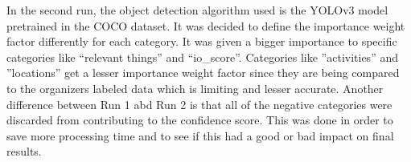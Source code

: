     In the second run, the object detection algorithm used is the YOLOv3 model pretrained in the COCO dataset.  It was decided to define the importance weight factor differently for each category. It was given a bigger importance to specific categories like \enquote{relevant things} and \enquote{io\_score}. Categories like ”activities” and ”locations” get a lesser importance weight factor since they are being compared to the organizers labeled data which is limiting and lesser accurate.  Another difference between Run 1 abd Run 2 is that all of the negative categories were discarded from contributing to the confidence score. This was done in order to save more processing time and to see if this had a good or bad impact on final results.
    
